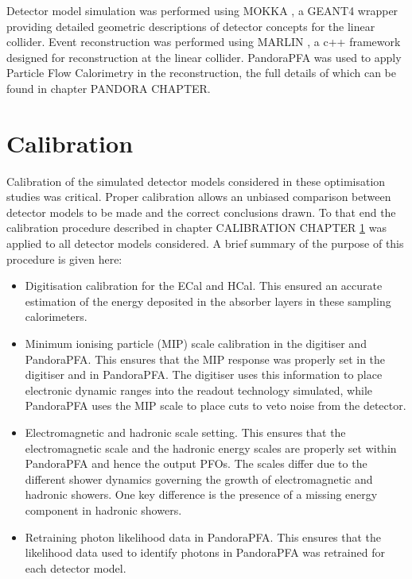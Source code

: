 Detector model simulation was performed using MOKKA \cite{MoradeFreitas:2002kj}, a GEANT4 \cite{Agostinelli:2002hh} wrapper providing detailed geometric descriptions of detector concepts for the linear collider.  Event reconstruction was performed using MARLIN \cite{Gaede:2006pj}, a c++ framework designed for reconstruction at the linear collider.  PandoraPFA \cite{arXiv:0907.3577, arXiv:1209.4039} was used to apply Particle Flow Calorimetry in the reconstruction, the full details of which can be found in chapter PANDORA CHAPTER.


\section{Calibration}
Calibration of the simulated detector models considered in these optimisation studies was critical.  Proper calibration allows an unbiased comparison between detector models to be made and the correct conclusions drawn.  To that end the calibration procedure described in chapter CALIBRATION CHAPTER \ref{} was applied to all detector models considered.  A brief summary of the purpose of this procedure is given here:

\begin{itemize}
\item Digitisation calibration for the ECal and HCal.  This ensured an accurate estimation of the energy deposited in the absorber layers in these sampling calorimeters.    
\item Minimum ionising particle (MIP) scale calibration in the digitiser and PandoraPFA.  This ensures that the MIP response was properly set in the digitiser and in PandoraPFA.  The digitiser uses this information to place electronic dynamic ranges into the readout technology simulated, while PandoraPFA uses the MIP scale to place cuts to veto noise from the detector.
\item Electromagnetic and hadronic scale setting.  This ensures that the electromagnetic scale and the hadronic energy scales are properly set within PandoraPFA and hence the output PFOs.  The scales differ due to the different shower dynamics governing the growth of electromagnetic and hadronic showers.  One key difference is the presence of a missing energy component in hadronic showers.  
\item Retraining photon likelihood data in PandoraPFA.  This ensures that the likelihood data used to identify photons in PandoraPFA was retrained for each detector model.   
\end{itemize}

